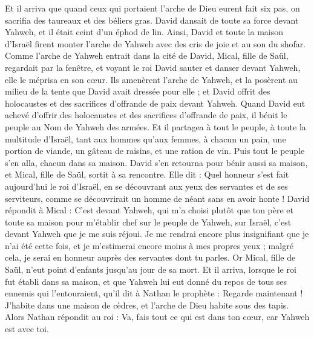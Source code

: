 \begin{multicols}{2}
Et il arriva que quand ceux qui portaient l'arche de Dieu eurent fait six pas, on sacrifia des taureaux et des béliers gras.
David dansait de toute sa force devant Yahweh, et il était ceint d'un éphod de lin.
Ainsi, David et toute la maison d'Israël firent monter l'arche de Yahweh avec des cris de joie et au son du shofar.
Comme l'arche de Yahweh entrait dans la cité de David, Mical, fille de Saül, regardait par la fenêtre, et voyant le roi David sauter et danser devant Yahweh, elle le méprisa en son cœur.
Ils amenèrent l'arche de Yahweh, et la posèrent au milieu de la tente que David avait dressée pour elle ; et David offrit des holocaustes et des sacrifices d'offrande de paix devant Yahweh.
Quand David eut achevé d'offrir des holocaustes et des sacrifices d'offrande de paix, il bénit le peuple au Nom de Yahweh des armées.
Et il partagea à tout le peuple, à toute la multitude d'Israël, tant aux hommes qu'aux femmes, à chacun un pain, une portion de viande, un gâteau de raisins, et une ration de vin. Puis tout le peuple s'en alla, chacun dans sa maison.
David s'en retourna pour bénir aussi sa maison, et Mical, fille de Saül, sortit à sa rencontre. Elle dit : Quel honneur s'est fait aujourd'hui le roi d'Israël, en se découvrant aux yeux des servantes et de ses serviteurs, comme se découvrirait un homme de néant sans en avoir honte !
David répondit à Mical : C'est devant Yahweh, qui m'a choisi plutôt que ton père et toute sa maison pour m'établir chef sur le peuple de Yahweh, sur Israël, c'est devant Yahweh que je me suis réjoui.
Je me rendrai encore plus insignifiant que je n'ai été cette fois, et je m'estimerai encore moins à mes propres yeux ; malgré cela, je serai en honneur auprès des servantes dont tu parles.
Or Mical, fille de Saül, n'eut point d'enfants jusqu'au jour de sa mort.
\VerseOne{}Et il arriva, lorsque le roi fut établi dans sa maison, et que Yahweh lui eut donné du repos de tous ses ennemis qui l'entouraient,
qu'il dit à Nathan le prophète : Regarde maintenant ! J'habite dans une maison de cèdres, et l'arche de Dieu habite sous des tapis.
Alors Nathan répondit au roi : Va, fais tout ce qui est dans ton cœur, car Yahweh est avec toi.

\end{multicols}
